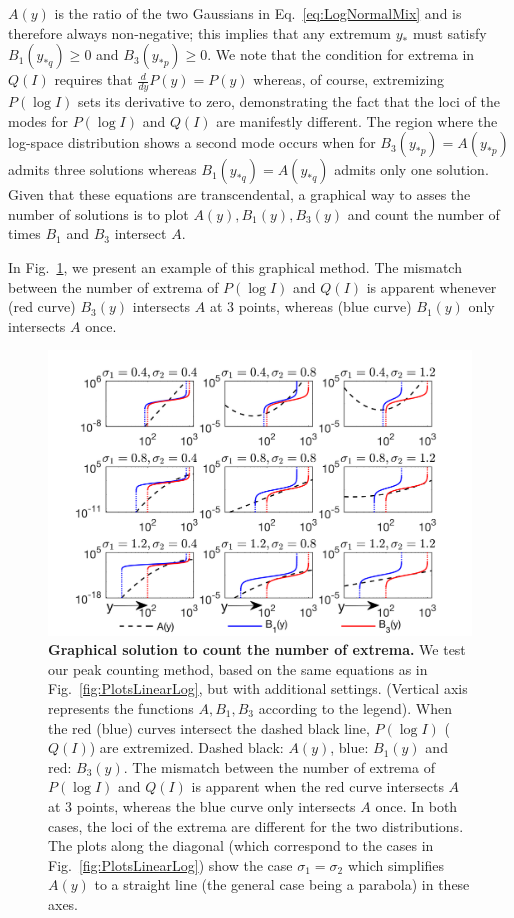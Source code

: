 \documentclass[11pt,a4paper,final]{article}
\begin{document}
\smallskip
$A(y)$ is the ratio of the two Gaussians in Eq.~\ref{eq:LogNormalMix} and is therefore always non-negative; this implies that any extremum $y_*$ must satisfy $B_1(y_{*q})\ge 0$ and $B_3(y_{*p})\ge 0$. We note that the condition for extrema in $Q(I)$ requires that $\frac{d}{dy}P(y)=P(y)$ whereas, of course, extremizing $P(\log I)$ sets its derivative to zero, demonstrating the fact that the loci of the modes for $P(\log I)$ and $Q(I)$ are manifestly different. The region where the log-space distribution shows a second mode occurs when for $B_3(y_{*p})=A(y_{*p})$ admits three solutions whereas $B_1(y_{*q})=A(y_{*q})$ admits only one solution. Given that these equations are transcendental, a graphical way to asses the number of solutions is to plot $A(y),B_1(y),B_3(y)$ and count the number of times $B_1$ and $B_3$ intersect $A$.\smallskip

In Fig.~\ref{fig:ExtremaSolutions}, we present an example of this graphical method. The mismatch between the number of extrema of $P(\log I)$ and $Q(I)$ is apparent whenever (red curve) $B_3(y)$ intersects $A$ at 3 points, whereas (blue curve) $B_1(y)$ only intersects $A$ once. \smallskip

\begin{figure}[!ht]
 \centering
  \includegraphics[clip,width=1\hsize]{Fig2.png}
  \caption{\textbf{Graphical solution to count the number of extrema.} We test our peak counting method, based on the same equations as in Fig.~\ref{fig:PlotsLinearLog}, but with additional settings. (Vertical axis represents the functions $A, B_1,B_3$ according to the legend). When the red (blue) curves intersect the dashed black line, $P(\log I)$ ($Q(I)$) are extremized. Dashed black: $A(y)$, blue: $B_1(y)$ and red: $B_3(y)$. The mismatch between the number of extrema of $P(\log I)$ and $Q(I)$ is apparent when the red curve intersects $A$ at 3 points, whereas the blue curve only intersects $A$ once. In both cases, the loci of the extrema are different for the two distributions. The plots along the diagonal (which correspond to the cases in Fig.~\ref{fig:PlotsLinearLog}) show the case $\sigma_1=\sigma_2$ which simplifies $A(y)$ to a straight line (the general case being a parabola) in these axes.}
  \label{fig:ExtremaSolutions}
\end{figure}
\end{document}
